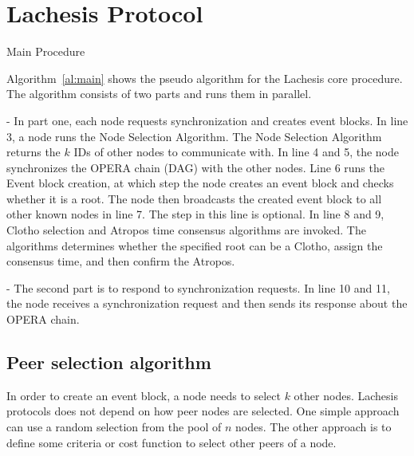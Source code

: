 \documentclass{article}
\makeatletter
\def\BState{\State\hskip-\ALG@thistlm}
\makeatother
\begin{document}
\newpage
\section{Lachesis Protocol}\label{se:lca}

\begin{algorithm}[H]
\caption{Main Procedure}\label{al:main}
\end{algorithm}

Algorithm~\ref{al:main} shows the pseudo algorithm for the Lachesis core procedure. The algorithm consists of two parts and runs them in parallel.

- In part one, each node requests synchronization and creates event blocks. In line 3, a node runs the Node Selection Algorithm. The Node Selection Algorithm returns the $k$ IDs of other nodes to communicate with. In line 4 and 5, the node synchronizes the OPERA chain (DAG) with the other nodes. Line 6 runs the Event block creation, at which step the node creates an event block and checks whether it is a root. The node then broadcasts the created event block to all other known nodes in line 7. The step in this line is optional. In line 8 and 9, Clotho selection and Atropos time consensus algorithms are invoked. The algorithms determines whether the specified root can be a Clotho, assign the consensus time, and then confirm the Atropos. 

- The second part is to respond to synchronization requests. In line 10 and 11, the node receives a synchronization request and then sends its response about the OPERA chain.

\subsection{Peer selection algorithm}
In order to create an event block, a node needs to select $k$ other nodes. Lachesis protocols does not depend on how peer nodes are selected. One simple approach can use a random selection from the pool of $n$ nodes. The other approach is to define some criteria or cost function to select other peers of a node. 
\end{document}
